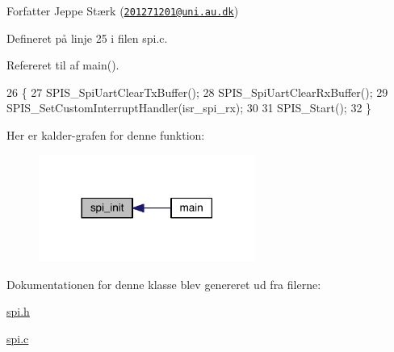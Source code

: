 \begin{DoxyAuthor}{Forfatter}
Jeppe Stærk (\href{mailto:201271201@uni.au.dk}{\tt 201271201@uni.\+au.\+dk}) 
\end{DoxyAuthor}


Defineret på linje 25 i filen spi.\+c.



Refereret til af main().


\begin{DoxyCode}
26 \{
27   SPIS\_SpiUartClearTxBuffer();
28   SPIS\_SpiUartClearRxBuffer();
29   SPIS\_SetCustomInterruptHandler(isr\_spi\_rx);
30   
31   SPIS\_Start();
32 \}
\end{DoxyCode}


Her er kalder-\/grafen for denne funktion\+:\nopagebreak
\begin{figure}[H]
\begin{center}
\leavevmode
\includegraphics[width=201pt]{d3/dfe/class_s_p_i_a5db0aceecaf7db5fbe2984e88fef3734_icgraph}
\end{center}
\end{figure}




Dokumentationen for denne klasse blev genereret ud fra filerne\+:\begin{DoxyCompactItemize}
\item 
\hyperlink{spi_8h}{spi.\+h}\item 
\hyperlink{spi_8c}{spi.\+c}\end{DoxyCompactItemize}
